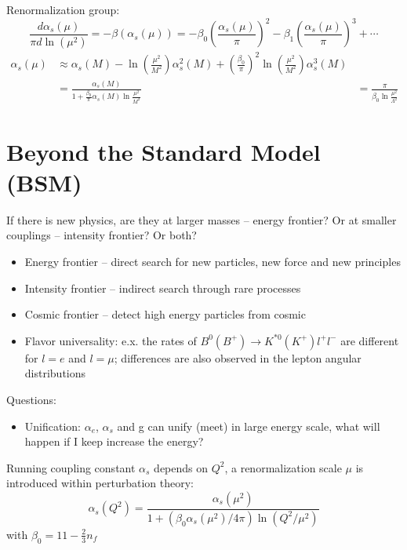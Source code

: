 Renormalization group:
\begin{equation*}
    \frac{d\alpha_s(\mu)}{\pi d\ln(\mu^2)} = -\beta(\alpha_s(\mu)) = 
	-\beta_0\left( \frac{\alpha_s(\mu)}{\pi} \right)^2 
	-\beta_1\left( \frac{\alpha_s(\mu)}{\pi} \right)^3 
	+ \cdots
\end{equation*}
\begin{equation*}
    \begin{aligned}
	\alpha_s(\mu) &\approx \alpha_s(M) - \ln\left( \frac{\mu^2}{M^2} \right) \alpha_s^2(M) 
	    + \left( \frac{\beta_0}{\pi} \right)^2 \ln\left( \frac{\mu^2}{M^2} \right) \alpha_s^3(M)    \\
	    &= \frac{\alpha_s(M)}{1+\frac{\beta_0}{\pi}\alpha_s(M)\ln\frac{\mu^2}{M^2}}
	    &= \frac{\pi}{\beta_0\ln\frac{\mu^2}{\Lambda^2}}
    \end{aligned}
\end{equation*}
\section{Beyond the Standard Model (BSM)}
If there is new physics, are they at larger masses -- energy frontier? Or at
smaller couplings -- intensity frontier? Or both?
\begin{itemize}
    \item Energy frontier -- direct search for new particles, new force and new 
	principles
    \item Intensity frontier -- indirect search through rare processes
    \item Cosmic frontier -- detect high energy particles from cosmic
\end{itemize}

\begin{itemize}
    \item Flavor universality: e.x. the rates of $B^0 (B^+) \rightarrow K^{*0} (K^+) l^+l^-$
	are different for $l=e$ and $l=\mu$; differences are also observed in the
	lepton angular distributions
\end{itemize}
Questions:
\begin{itemize}
    \item Unification: $\alpha_e$, $\alpha_s$ and g can unify (meet) in large energy 
	scale, what will happen if I keep increase the energy?
\end{itemize}
Running coupling constant $\alpha_s$ depends on $Q^2$, a renormalization scale 
$\mu$ is introduced within perturbation theory:
$$ \alpha_s(Q^2) = \frac{\alpha_s(\mu^2)}{1 + (\beta_0\alpha_s(\mu^2)/4\pi)\ln(Q^2/\mu^2)}$$
with $\beta_0 = 11 - \frac{2}{3}n_f$

